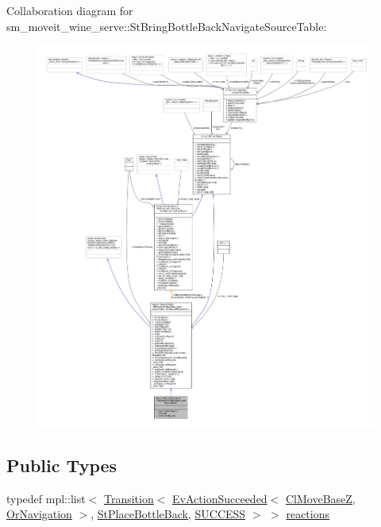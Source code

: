 Collaboration diagram for sm\+\_\+moveit\+\_\+wine\+\_\+serve\+:\+:St\+Bring\+Bottle\+Back\+Navigate\+Source\+Table\+:
\nopagebreak
\begin{figure}[H]
\begin{center}
\leavevmode
\includegraphics[width=350pt]{structsm__moveit__wine__serve_1_1StBringBottleBackNavigateSourceTable__coll__graph}
\end{center}
\end{figure}
\subsection*{Public Types}
\begin{DoxyCompactItemize}
\item 
typedef mpl\+::list$<$ \hyperlink{classsmacc_1_1Transition}{Transition}$<$ \hyperlink{structsmacc_1_1default__events_1_1EvActionSucceeded}{Ev\+Action\+Succeeded}$<$ \hyperlink{classcl__move__base__z_1_1ClMoveBaseZ}{Cl\+Move\+BaseZ}, \hyperlink{classsm__moveit__wine__serve_1_1OrNavigation}{Or\+Navigation} $>$, \hyperlink{structsm__moveit__wine__serve_1_1StPlaceBottleBack}{St\+Place\+Bottle\+Back}, \hyperlink{structsmacc_1_1default__transition__tags_1_1SUCCESS}{S\+U\+C\+C\+E\+SS} $>$ $>$ \hyperlink{structsm__moveit__wine__serve_1_1StBringBottleBackNavigateSourceTable_a0ac0aa893d92d3a8420ee32cfb082a03}{reactions}
\end{DoxyCompactItemize}
